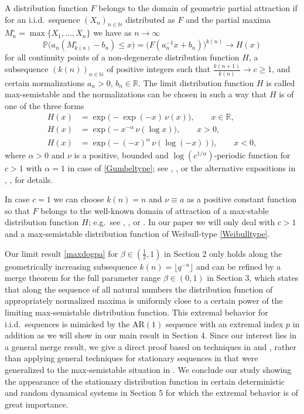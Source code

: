 \documentclass[12pt]{amsart}
\theoremstyle{definition}
\theoremstyle{remark}
\newcommand{\rr}{{\mathbb R}}
\newcommand{\nat}{{\mathbb N}}
\newcommand{\AR}{\operatorname{AR(1)}}
\newcommand{\Pm}{{\mathbb P}}
\numberwithin{equation}{section}
\begin{document}
A distribution function $F$ belongs to the domain of geometric partial attraction if for an i.i.d.\ sequence $(X_n)_{n\in\nat}$ distributed as $F$ and the partial maxima $M_n^\circ=\max\{X_1,\ldots,X_n\}$ we have as $n\to\infty$
\begin{equation}\label{maxdogpa}
\Pm\big(a_n(M_{k(n)}^\circ-b_n)\leq x\big)=\big(F(a_n^{-1}x+b_n)\big)^{k(n)}\to H(x)
\end{equation}
for all continuity points of a non-degenerate distribution function $H$, a subsequence $(k(n))_{n\in\nat}$ of positive integers such that  $\frac{k(n+1)}{k(n)}\to c\geq1$, and certain normalizations $a_n>0$, $b_n\in\rr$. The limit distribution function $H$ is called max-semistable and the normalizations can be chosen in such a way that $H$ is of one of the three forms
\begin{align}
H(x) & =\exp\big(-\exp(-x)\,\nu(x)\big),\qquad x\in\rr,\label{Gumbeltype}\\
H(x) & =\exp\big(-x^{-\alpha}\,\nu(\log x)\big),\qquad x>0,\\
H(x) & =\exp\big(-(-x)^{\alpha}\,\nu(\log(-x))\big),\qquad x<0,\label{Weibulltype}
\end{align}
where $\alpha>0$ and $\nu$ is a positive, bounded and $\log(c^{1/\alpha})$-periodic function for $c>1$ with $\alpha=1$ in case of \eqref{Gumbeltype}; see \cite{Gri1}, \cite{Gri2}, or the alternative expositions in \cite{CHT}, \cite{Megyesi}, \cite{Pan} for details.

In case $c=1$ we can choose $k(n)=n$ and $\nu\equiv a$ as a positive constant function so that $F$ belongs to the well-known domain of attraction of a max-stable distribution function $H$; e.g.\ see \cite{Gal}, \cite{HF}, or \cite{Res}. In our paper we will only deal with $c>1$ and a max-semistable distribution function of Weibull-type \eqref{Weibulltype}.

Our limit result \eqref{maxdogpa} for $\beta\in(\frac12,1)$ in Section 2 only holds along the geometrically increasing subsequence $k(n)=\lfloor q^{-n}\rfloor$ and can be refined by a merge theorem \cite{Megyesi} for the full parameter range $\beta\in(0,1)$ in Section 3, which states that along the sequence of all natural numbers the distribution function of appropriately normalized maxima is uniformly close to a certain power of the limiting max-semistable distribution function. This extremal behavior for i.i.d.\ sequences is mimicked by the $\AR$ sequence with an extremal index $p$ in addition as we will show in our main result in Section 4. Since our interest lies in a general merge result, we give a direct proof based on techniques in \cite{Cher} and \cite{GMS}, rather than applying general techniques for stationary sequences in \cite{LLR} that were generalized to the max-semistable situation in \cite{TemCan}. We conclude our study showing the appearance of the stationary distribution function in certain deterministic and random dynamical systems in Section 5 for which the extremal behavior is of great importance.
\end{document}
